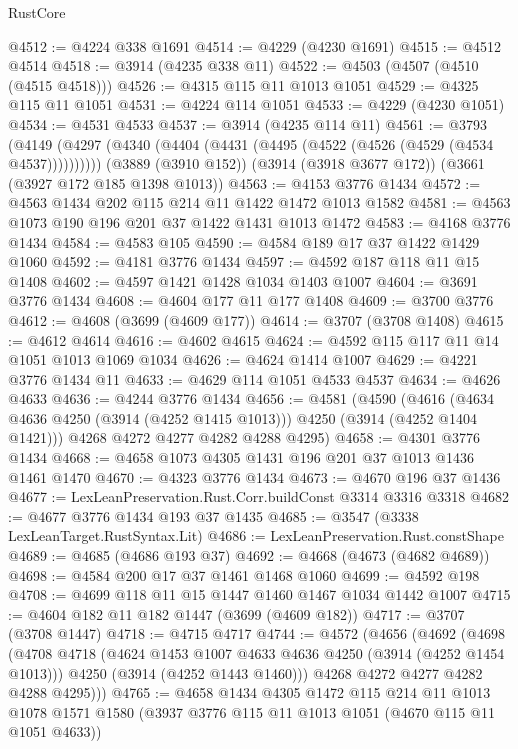 \begin{lexlean}{RustCore}
\begin{coremodule}
@4512 := @4224 @338 @1691
@4514 := @4229 (@4230 @1691)
@4515 := @4512 @4514
@4518 := @3914 (@4235 @338 @11)
@4522 := @4503 (@4507 (@4510 (@4515 @4518)))
@4526 := @4315 @115 @11 @1013 @1051
@4529 := @4325 @115 @11 @1051
@4531 := @4224 @114 @1051
@4533 := @4229 (@4230 @1051)
@4534 := @4531 @4533
@4537 := @3914 (@4235 @114 @11)
@4561 := @3793
    (@4149 (@4297 (@4340 (@4404 (@4431 (@4495 (@4522 (@4526 (@4529 (@4534 @4537))))))))))
    (@3889 (@3910 @152))
    (@3914 (@3918 @3677 @172))
    (@3661 (@3927 @172 @185 @1398 @1013))
@4563 := @4153 @3776 @1434
@4572 := @4563 @1434 @202 @115 @214 @11 @1422 @1472 @1013 @1582
@4581 := @4563 @1073 @190 @196 @201 @37 @1422 @1431 @1013 @1472
@4583 := @4168 @3776 @1434
@4584 := @4583 @105
@4590 := @4584 @189 @17 @37 @1422 @1429 @1060
@4592 := @4181 @3776 @1434
@4597 := @4592 @187 @118 @11 @15 @1408
@4602 := @4597 @1421 @1428 @1034 @1403 @1007
@4604 := @3691 @3776 @1434
@4608 := @4604 @177 @11 @177 @1408
@4609 := @3700 @3776
@4612 := @4608 (@3699 (@4609 @177))
@4614 := @3707 (@3708 @1408)
@4615 := @4612 @4614
@4616 := @4602 @4615
@4624 := @4592 @115 @117 @11 @14 @1051 @1013 @1069 @1034
@4626 := @4624 @1414 @1007
@4629 := @4221 @3776 @1434 @11
@4633 := @4629 @114 @1051 @4533 @4537
@4634 := @4626 @4633
@4636 := @4244 @3776 @1434
@4656 := @4581
    (@4590
      (@4616 (@4634 @4636 @4250 (@3914 (@4252 @1415 @1013))) @4250 (@3914 (@4252 @1404 @1421)))
      @4268
      @4272
      @4277
      @4282
      @4288
      @4295)
@4658 := @4301 @3776 @1434
@4668 := @4658 @1073 @4305 @1431 @196 @201 @37 @1013 @1436 @1461 @1470
@4670 := @4323 @3776 @1434
@4673 := @4670 @196 @37 @1436
@4677 := LexLeanPreservation.Rust.Corr.buildConst @3314 @3316 @3318
@4682 := @4677 @3776 @1434 @193 @37 @1435
@4685 := @3547 (@3338 LexLeanTarget.RustSyntax.Lit)
@4686 := LexLeanPreservation.Rust.constShape
@4689 := @4685 (@4686 @193 @37)
@4692 := @4668 (@4673 (@4682 @4689))
@4698 := @4584 @200 @17 @37 @1461 @1468 @1060
@4699 := @4592 @198
@4708 := @4699 @118 @11 @15 @1447 @1460 @1467 @1034 @1442 @1007
@4715 := @4604 @182 @11 @182 @1447 (@3699 (@4609 @182))
@4717 := @3707 (@3708 @1447)
@4718 := @4715 @4717
@4744 := @4572
    (@4656
      (@4692
        (@4698
          (@4708
            @4718
            (@4624 @1453 @1007 @4633 @4636 @4250 (@3914 (@4252 @1454 @1013)))
            @4250
            (@3914 (@4252 @1443 @1460)))
          @4268
          @4272
          @4277
          @4282
          @4288
          @4295)))
@4765 := @4658
    @1434
    @4305
    @1472
    @115
    @214
    @11
    @1013
    @1078
    @1571
    @1580
    (@3937 @3776 @115 @11 @1013 @1051 (@4670 @115 @11 @1051 @4633))

\end{coremodule}
\end{lexlean}
